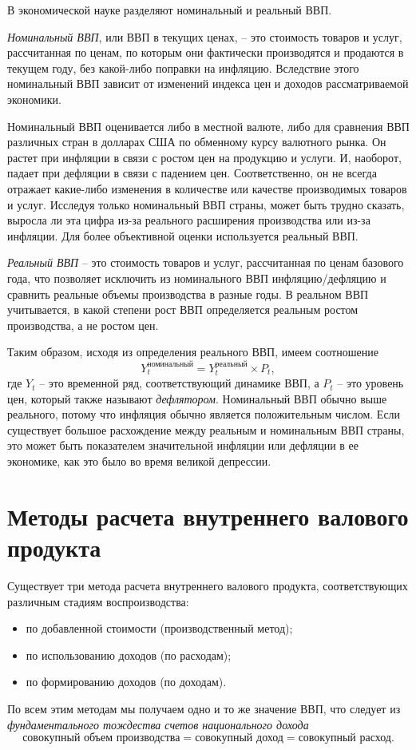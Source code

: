 \documentclass[a4paper, 14pt]{extreport}
\numberwithin{equation}{section}
\numberwithin{equation}{section}
\begin{document}
	В экономической науке разделяют {номинальный} и {реальный} ВВП.

	\textit{Номинальный ВВП}, или ВВП в текущих ценах, -- это стоимость товаров и услуг, рассчитанная по ценам, по которым они фактически производятся и продаются в текущем году, без какой-либо поправки на инфляцию. Вследствие этого номинальный ВВП зависит от изменений индекса цен и доходов рассматриваемой экономики. 
	
	Номинальный ВВП оценивается либо в местной валюте, либо для сравнения ВВП различных стран в долларах США по обменному курсу валютного рынка. Он растет при инфляции в связи с ростом цен на продукцию и услуги. И, наоборот, падает при дефляции в связи с падением цен. Соответственно, он не всегда отражает какие-либо изменения в количестве или качестве производимых товаров и услуг. Исследуя только номинальный ВВП страны, может быть трудно сказать, выросла ли эта цифра из-за реального расширения производства или из-за инфляции. Для более объективной оценки используется реальный ВВП.
	
	\textit{Реальный ВВП} -- это стоимость товаров и услуг, рассчитанная по ценам базового года, что позволяет исключить из номинального ВВП инфляцию/дефляцию и сравнить реальные объемы производства в разные годы.
	В реальном ВВП учитывается, в какой степени рост ВВП определяется реальным ростом производства, а не ростом цен.
	
	Таким образом, исходя из определения реального ВВП, имеем соотношение
	\begin{equation}\label{gdp_nom}
		Y^\text{номинальный}_t = Y^\text{реальный}_t \times P_t,
	\end{equation}
	где $Y_t$ -- это временной ряд, соответствующий динамике ВВП, а $P_t$ -- это уровень цен, который также называют \textit{дефлятором}. Номинальный ВВП обычно выше реального, потому что инфляция обычно является положительным числом. Если существует большое расхождение между реальным и номинальным ВВП страны, это может быть показателем значительной инфляции или дефляции в ее экономике, как это было во время великой депрессии.
	
	\section{Методы расчета внутреннего валового продукта}
	\label{sec:gdp-methods}
	
	Существует три метода расчета внутреннего валового продукта, соответствующих различным стадиям воспроизводства:	
	\begin{itemize}
		\item по добавленной стоимости (производственный метод);
		\item по использованию доходов (по расходам);
		\item по формированию доходов (по доходам).
	\end{itemize}
	По всем этим методам мы получаем одно и то же значение ВВП, что следует из \textit{фундаментального тождества счетов национального дохода}
	\begin{equation}
		\text{совокупный объем производства} = \text{совокупный доход} = \text{совокупный расход}.
	\end{equation}
\end{document}
